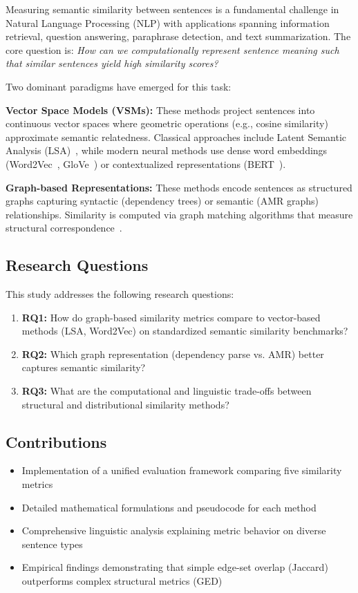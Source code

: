\documentclass[11pt,a4paper]{article}
\begin{document}
Measuring semantic similarity between sentences is a fundamental challenge in Natural Language Processing (NLP) with applications spanning information retrieval, question answering, paraphrase detection, and text summarization. The core question is: \textit{How can we computationally represent sentence meaning such that similar sentences yield high similarity scores?}

Two dominant paradigms have emerged for this task:

\textbf{Vector Space Models (VSMs):} These methods project sentences into continuous vector spaces where geometric operations (e.g., cosine similarity) approximate semantic relatedness. Classical approaches include Latent Semantic Analysis (LSA)~\citep{deerwester1990indexing}, while modern neural methods use dense word embeddings (Word2Vec~\citep{mikolov2013efficient}, GloVe~\citep{pennington2014glove}) or contextualized representations (BERT~\citep{devlin2018bert}).

\textbf{Graph-based Representations:} These methods encode sentences as structured graphs capturing syntactic (dependency trees) or semantic (AMR graphs) relationships. Similarity is computed via graph matching algorithms that measure structural correspondence~\citep{bunke1997relation}.

\subsection{Research Questions}

This study addresses the following research questions:
\begin{enumerate}
    \item \textbf{RQ1:} How do graph-based similarity metrics compare to vector-based methods (LSA, Word2Vec) on standardized semantic similarity benchmarks?
    \item \textbf{RQ2:} Which graph representation (dependency parse vs. AMR) better captures semantic similarity?
    \item \textbf{RQ3:} What are the computational and linguistic trade-offs between structural and distributional similarity methods?
\end{enumerate}

\subsection{Contributions}

\begin{itemize}
    \item Implementation of a unified evaluation framework comparing five similarity metrics
    \item Detailed mathematical formulations and pseudocode for each method
    \item Comprehensive linguistic analysis explaining metric behavior on diverse sentence types
    \item Empirical findings demonstrating that simple edge-set overlap (Jaccard) outperforms complex structural metrics (GED)
\end{itemize}
\end{document}
